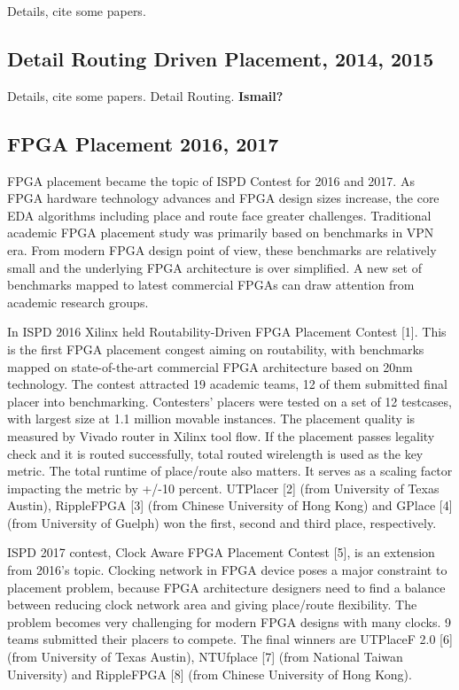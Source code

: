 \documentclass[sigconf]{acmart}
\begin{document}

Details, cite some papers.

\subsection{Detail Routing Driven Placement, 2014, 2015}

Details, cite some papers.
Detail Routing.
{\bf Ismail?}



\subsection{FPGA Placement 2016, 2017}

FPGA placement became the topic of ISPD Contest for 2016 and 2017. As
FPGA hardware technology advances and FPGA design sizes increase, the
core EDA algorithms including place and route face greater
challenges. Traditional academic FPGA placement study was primarily
based on benchmarks in VPN era. From modern FPGA design point of view,
these benchmarks are relatively small and the underlying FPGA
architecture is over simplified. A new set of benchmarks mapped to
latest commercial FPGAs can draw attention from academic research
groups.

In ISPD 2016 Xilinx held Routability-Driven FPGA Placement Contest
\cite{sy1}[1]. This is the first FPGA placement congest aiming on routability,
with benchmarks mapped on state-of-the-art commercial FPGA
architecture based on 20nm technology. The contest attracted 19
academic teams, 12 of them submitted final placer into
benchmarking. Contesters' placers were tested on a set of 12
testcases, with largest size at 1.1 million movable instances. The
placement quality is measured by Vivado router in Xilinx tool flow. If
the placement passes legality check and it is routed successfully,
total routed wirelength is used as the key metric. The total runtime
of place/route also matters. It serves as a scaling factor impacting
the metric by +/-10 percent.  UTPlacer\cite{sy2} [2] (from University of Texas
Austin), RippleFPGA\cite{sy3} [3] (from Chinese University of Hong Kong) and
GPlace\cite{sy4} [4] (from University of Guelph) won the first, second and third
place, respectively.

ISPD 2017 contest, Clock Aware FPGA Placement Contest\cite{sy5} [5], is an
extension from 2016’s topic. Clocking network in FPGA device poses a
major constraint to placement problem, because FPGA architecture
designers need to find a balance between reducing clock network area
and giving place/route flexibility. The problem becomes very
challenging for modern FPGA designs with many clocks. 9 teams
submitted their placers to compete. The final winners are UTPlaceF 2.0
\cite{sy6}[6] (from University of Texas Austin), NTUfplace\cite{sy7} [7] (from National
Taiwan University) and RippleFPGA\cite{sy8} [8] (from Chinese University of Hong
Kong).
\end{document}

